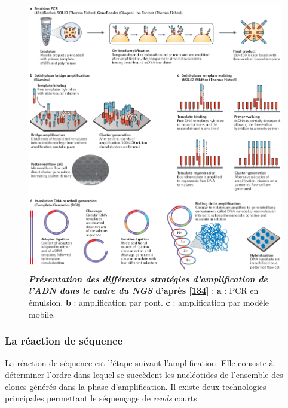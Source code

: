\documentclass[12pt,a4paper,twoside]{ugathesis}
\theoremstyle{definition}
\theoremstyle{definition}
\theoremstyle{definition}
\theoremstyle{remark}
\begin{document}
\begin{figure}

{\centering \includegraphics[scale=.5]{figure/ngs_amplification} 

}

\caption[Présentation des différentes stratégies d'amplification de l'ADN dans le cadre du NGS]{\textbf{\emph{Présentation des différentes stratégies
d'amplification de l'ADN dans le cadre du NGS} d'après
{[}\protect\hyperlink{ref-Goodwin2016}{134}{]}} : \textbf{a} : PCR en
émulsion. \textbf{b} : amplification par pont. \textbf{c} :
amplification par modèle mobile.}\label{fig:pictngsampli}
\end{figure}







\newpage

\subsubsection{La réaction de séquence}\label{la-reaction-de-sequence}

La réaction de séquence est l'étape suivant l'amplification. Elle
consiste à déterminer l'ordre dans lequel se succèdent les nucléotides
de l'ensemble des clones générés dans la phase d'amplification. Il
existe deux technologies principales permettant le séquençage de
\emph{reads} courts :
\end{document}
